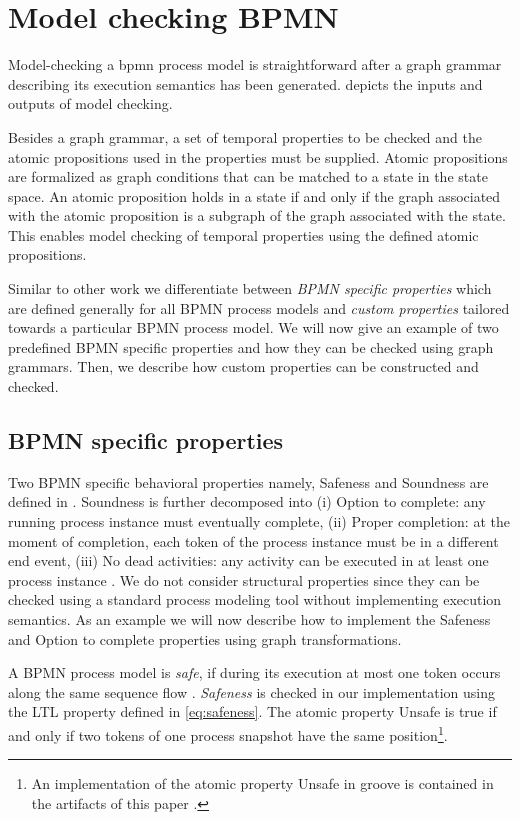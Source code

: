 \documentclass[adraft, copyright, creativecommons]{eptcs} %
\begin{document}
\section{Model checking BPMN} \label{sec:modelChecking}

Model-checking a \gls*{bpmn} process model is straightforward after a graph grammar describing its execution semantics has been generated.
 depicts the inputs and outputs of model checking.

Besides a graph grammar, a set of temporal properties to be checked and the atomic propositions used in the properties must be supplied.
Atomic propositions are formalized as graph conditions that can be matched to a state in the state space.
An atomic proposition holds in a state if and only if the graph associated with the atomic proposition is a subgraph of the graph associated with the state. %
This enables model checking of temporal properties using the defined atomic propositions.

Similar to other work we differentiate between \emph{BPMN specific properties} which are defined generally for all BPMN process models and \emph{custom properties} tailored towards a particular BPMN process model.
We will now give an example of two predefined BPMN specific properties and how they can be checked using graph grammars.
Then, we describe how custom properties can be constructed and checked.

\subsection{BPMN specific properties}
Two BPMN specific behavioral properties namely, Safeness and Soundness are defined in \cite{corradiniClassificationBPMNCollaborations2018}.
Soundness is further decomposed into (i) Option to complete: any running process instance must eventually complete, (ii) Proper completion: at the moment of completion, each token of the process instance must be in a different end event, (iii) No dead activities: any activity can be executed in at least one process instance \cite{corradiniClassificationBPMNCollaborations2018}.
We do not consider structural properties since they can be checked using a standard process modeling tool without implementing execution semantics.
As an example we will now describe how to implement the Safeness and Option to complete properties using graph transformations.

A BPMN process model is \emph{safe}, if during its execution at most one token occurs along the same sequence flow \cite{corradiniClassificationBPMNCollaborations2018}.
\emph{Safeness} is checked in our implementation using the LTL property defined in \eqref{eq:safeness}.
The atomic property \textsf{Unsafe} is true if and only if two tokens of one process snapshot have the same position\footnote{An implementation of the atomic property \textsf{Unsafe} in groove is contained in the artifacts of this paper \cite{timkrauterArtifactsTERMGRAPH2022}.}.
\end{document}
